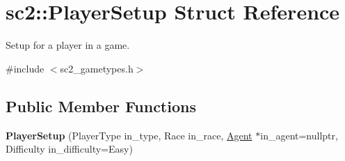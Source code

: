 \hypertarget{structsc2_1_1_player_setup}{}\section{sc2\+:\+:Player\+Setup Struct Reference}
\label{structsc2_1_1_player_setup}


Setup for a player in a game.  




{\ttfamily \#include $<$sc2\+\_\+gametypes.\+h$>$}

\subsection*{Public Member Functions}
\begin{DoxyCompactItemize}
\item 
\mbox{\label{structsc2_1_1_player_setup_a97fc7c0166caacfbc44359a3cd59a989}} 
{\bfseries Player\+Setup} (Player\+Type in\+\_\+type, Race in\+\_\+race, \hyperlink{classsc2_1_1_agent}{Agent} $\ast$in\+\_\+agent=nullptr, Difficulty in\+\_\+difficulty=Easy)
\end{DoxyCompactItemize}
